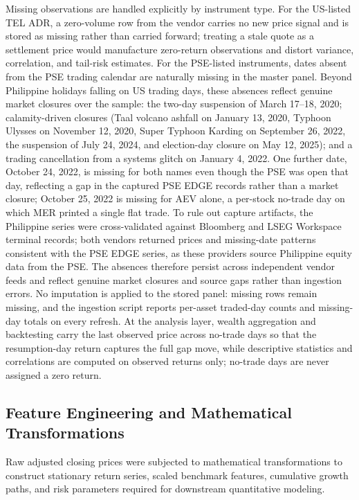 Missing observations are handled explicitly by instrument type. For the US-listed TEL ADR, a zero-volume row from the vendor carries no new price signal and is stored as missing rather than carried forward; treating a stale quote as a settlement price would manufacture zero-return observations and distort variance, correlation, and tail-risk estimates. For the PSE-listed instruments, dates absent from the PSE trading calendar are naturally missing in the master panel. Beyond Philippine holidays falling on US trading days, these absences reflect genuine market closures over the sample: the two-day suspension of March 17--18, 2020; calamity-driven closures (Taal volcano ashfall on January 13, 2020, Typhoon Ulysses on November 12, 2020, Super Typhoon Karding on September 26, 2022, the suspension of July 24, 2024, and election-day closure on May 12, 2025); and a trading cancellation from a systems glitch on January 4, 2022. One further date, October 24, 2022, is missing for both names even though the PSE was open that day, reflecting a gap in the captured PSE EDGE records rather than a market closure; October 25, 2022 is missing for AEV alone, a per-stock no-trade day on which MER printed a single flat trade. To rule out capture artifacts, the Philippine series were cross-validated against Bloomberg and LSEG Workspace terminal records; both vendors returned prices and missing-date patterns consistent with the PSE EDGE series, as these providers source Philippine equity data from the PSE. The absences therefore persist across independent vendor feeds and reflect genuine market closures and source gaps rather than ingestion errors. No imputation is applied to the stored panel: missing rows remain missing, and the ingestion script reports per-asset traded-day counts and missing-day totals on every refresh. At the analysis layer, wealth aggregation and backtesting carry the last observed price across no-trade days so that the resumption-day return captures the full gap move, while descriptive statistics and correlations are computed on observed returns only; no-trade days are never assigned a zero return.

\subsection{Feature Engineering and Mathematical Transformations}

Raw adjusted closing prices were subjected to mathematical transformations to construct stationary return series, scaled benchmark features, cumulative growth paths, and risk parameters required for downstream quantitative modeling.

